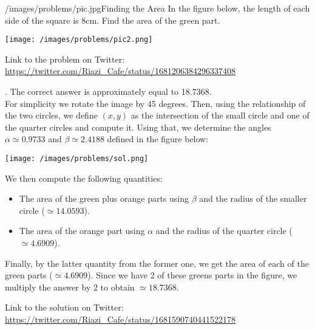 \begin{problem}{/images/problems/pic.jpg}{Finding the Area}
	In the figure below, the length of each side of the square is 8cm. Find the area of the green part.

\begin{center}
	\texttt{[image: /images/problems/pic2.png]}
\end{center}

Link to the problem on Twitter: \url{https://twitter.com/Riazi_Cafe/status/1681206384296337408}

\end{problem}
\begin{solution}.
The correct answer is approximately equal to 18.7368.\\[0.2cm]

For simplicity we rotate the image by 45 degrees. Then, using the relationship of the two circles, we define $(x,y)$ as the intersection of the small circle and one of the quarter circles and compute it. Using that, we determine the angles $\alpha \simeq 0.9733$ and $\beta \simeq 2.4188$ defined in the figure below:

\begin{center}
	\texttt{[image: /images/problems/sol.png]}
\end{center}

We then compute the following quantities:
\begin{itemize}
\item The area of the green plus orange parts using $\beta$ and the radius of the smaller circle ($\simeq 14.0593$).
\item The area of the orange part using $\alpha$ and the radius of the quarter circle ($\simeq 4.6909$).
\end{itemize}
Finally, by the latter quantity from the former one, we get the area of each of the green parts ($\simeq 4.6909$). Since we have 2 of these greens parts in the figure, we multiply the answer by 2 to obtain $\simeq 18.7368$.


Link to the solution on Twitter:  \url{https://twitter.com/Riazi_Cafe/status/1681590740441522178}
\end{solution}
